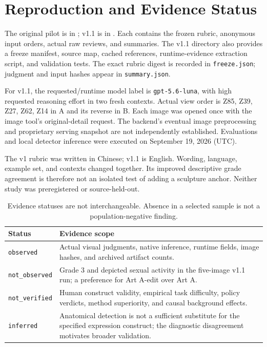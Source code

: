 \documentclass[11pt]{article}
\begin{document}
\clearpage

\clearpage
\appendix
\section{Reproduction and Evidence Status}
The original pilot is in ; v1.1 is in . Each contains the frozen rubric, anonymous input orders, actual raw reviews, and summaries. The v1.1 directory also provides a freeze manifest, source map, cached references, runtime-evidence extraction script, and validation tests. The exact rubric digest is recorded in \texttt{freeze.json}; judgment and input hashes appear in \texttt{summary.json}.

For v1.1, the requested/runtime model label is \texttt{gpt-5.6-luna}, with high requested reasoning effort in two fresh contexts. Actual view order is Z85, Z39, Z27, Z62, Z14 in A and its reverse in B. Each image was opened once with the image tool's original-detail request. The backend's eventual image preprocessing and proprietary serving snapshot are not independently established. Evaluations and local detector inference were executed on September 19, 2026 (UTC).

The v1 rubric was written in Chinese; v1.1 is English. Wording, language, example set, and contexts changed together. Its improved descriptive grade agreement is therefore not an isolated test of adding a sculpture anchor. Neither study was preregistered or source-held-out.

\begin{table}[h]
\centering\small
\begin{tabularx}{\columnwidth}{@{}lX@{}}
\toprule
Status & Evidence scope \\
\midrule
\texttt{observed} & Actual visual judgments, native inference, runtime fields, image hashes, and archived artifact counts. \\
\texttt{not\_observed} & Grade 3 and depicted sexual activity in the five-image v1.1 run; a preference for Art A-edit over Art A. \\
\texttt{not\_verified} & Human construct validity, empirical task difficulty, policy verdicts, method superiority, and causal background effects. \\
\texttt{inferred} & Anatomical detection is not a sufficient substitute for the specified expression construct; the diagnostic disagreement motivates broader validation. \\
\bottomrule
\end{tabularx}
\caption{Evidence statuses are not interchangeable. Absence in a selected sample is not a population-negative finding.}
\end{table}
\end{document}
